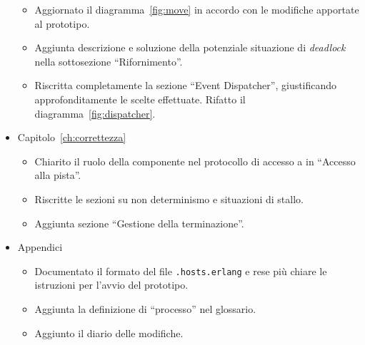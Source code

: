 \begin{itemize}
\begin{itemize}
	\item Aggiornato il diagramma~\ref{fig:move} in accordo con le modifiche apportate al prototipo.
	\item Aggiunta descrizione e soluzione della potenziale situazione di \textit{deadlock} nella sottosezione ``Rifornimento''.
	\item Riscritta completamente la sezione ``Event Dispatcher'', giustificando approfonditamente le scelte effettuate. Rifatto il diagramma~\ref{fig:dispatcher}.
	\end{itemize}
\item Capitolo~\ref{ch:correttezza}
	\begin{itemize}
	\item Chiarito il ruolo della componente \sched{} nel protocollo di accesso a \track{} in ``Accesso alla pista''.
	\item Riscritte le sezioni su non determinismo e situazioni di stallo.
	\item Aggiunta sezione ``Gestione della terminazione''.
	\end{itemize}
\item Appendici
	\begin{itemize}
	\item Documentato il formato del file \texttt{.hosts.erlang} e rese più chiare le istruzioni per l'avvio del prototipo.
	\item Aggiunta la definizione di ``processo'' nel glossario.
	\item Aggiunto il diario delle modifiche.
	\end{itemize}
\end{itemize}

